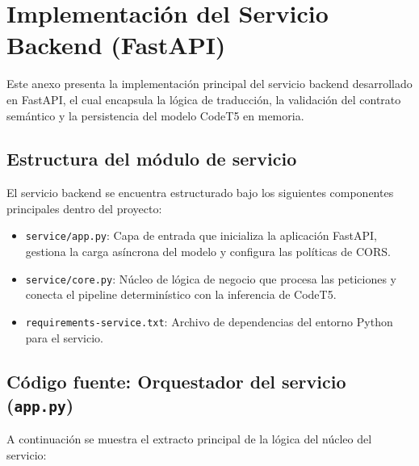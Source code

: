 \chapter{Implementación del Servicio Backend (FastAPI)}
\label{anx:servicio-fastapi}

Este anexo presenta la implementación principal del servicio backend desarrollado en FastAPI, el cual encapsula la lógica de traducción, la validación del contrato semántico y la persistencia del modelo CodeT5 en memoria.

\section{Estructura del módulo de servicio}
El servicio backend se encuentra estructurado bajo los siguientes componentes principales dentro del proyecto:
\begin{itemize}
    \item \texttt{service/app.py}: Capa de entrada que inicializa la aplicación FastAPI, gestiona la carga asíncrona del modelo y configura las políticas de CORS.
    \item \texttt{service/core.py}: Núcleo de lógica de negocio que procesa las peticiones y conecta el pipeline determinístico con la inferencia de CodeT5.
    \item \texttt{requirements-service.txt}: Archivo de dependencias del entorno Python para el servicio.
\end{itemize}

\section{Código fuente: Orquestador del servicio (\texttt{app.py})}
A continuación se muestra el extracto principal de la lógica del núcleo del servicio:

